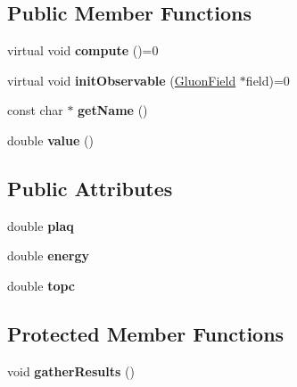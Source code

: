 \subsection*{Public Member Functions}
\begin{DoxyCompactItemize}
\item 
virtual void {\bfseries compute} ()=0\hypertarget{classObservable_a3a8881d961623cddb85416cefa1c5432}{}\label{classObservable_a3a8881d961623cddb85416cefa1c5432}

\item 
virtual void {\bfseries init\+Observable} (\hyperlink{field_8h_afe80b127697eba6d6e7fbd8121c8d4ee}{Gluon\+Field} $\ast$field)=0\hypertarget{classObservable_a1baf736c771a8a073554286571be8b09}{}\label{classObservable_a1baf736c771a8a073554286571be8b09}

\item 
const char $\ast$ {\bfseries get\+Name} ()\hypertarget{classObservable_ad3348c3f40782b5e09bc8dbcb8295a79}{}\label{classObservable_ad3348c3f40782b5e09bc8dbcb8295a79}

\item 
double {\bfseries value} ()\hypertarget{classObservable_ab7931d270397e55bfe82384b52db17a0}{}\label{classObservable_ab7931d270397e55bfe82384b52db17a0}

\end{DoxyCompactItemize}
\subsection*{Public Attributes}
\begin{DoxyCompactItemize}
\item 
double {\bfseries plaq}\hypertarget{classObservable_ad9e9bc025babb8fed348d7e16e424ae8}{}\label{classObservable_ad9e9bc025babb8fed348d7e16e424ae8}

\item 
double {\bfseries energy}\hypertarget{classObservable_afe50655b42d350df43ae1fe4ee8cf5fb}{}\label{classObservable_afe50655b42d350df43ae1fe4ee8cf5fb}

\item 
double {\bfseries topc}\hypertarget{classObservable_a18813c913b086462648c9e61d85d6be6}{}\label{classObservable_a18813c913b086462648c9e61d85d6be6}

\end{DoxyCompactItemize}
\subsection*{Protected Member Functions}
\begin{DoxyCompactItemize}
\item 
void {\bfseries gather\+Results} ()\hypertarget{classObservable_ae42f1c4bf6362dde45f8f6e8042f2ff5}{}\label{classObservable_ae42f1c4bf6362dde45f8f6e8042f2ff5}

\end{DoxyCompactItemize}
